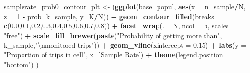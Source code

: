 \documentclass[
]{article}
\newenvironment{Shaded}{\begin{snugshade}}{\end{snugshade}}
\newcommand{\CharTok}[1]{\textcolor[rgb]{0.31,0.60,0.02}{#1}}
\newcommand{\DataTypeTok}[1]{\textcolor[rgb]{0.13,0.29,0.53}{#1}}
\newcommand{\DecValTok}[1]{\textcolor[rgb]{0.00,0.00,0.81}{#1}}
\newcommand{\FloatTok}[1]{\textcolor[rgb]{0.00,0.00,0.81}{#1}}
\newcommand{\KeywordTok}[1]{\textcolor[rgb]{0.13,0.29,0.53}{\textbf{#1}}}
\newcommand{\NormalTok}[1]{#1}
\newcommand{\OperatorTok}[1]{\textcolor[rgb]{0.81,0.36,0.00}{\textbf{#1}}}
\newcommand{\StringTok}[1]{\textcolor[rgb]{0.31,0.60,0.02}{#1}}
\begin{document}
\begin{Shaded}
\begin{Highlighting}[]
{\NormalTok{samplerate_prob0_contour_plt <-}\StringTok{ }\NormalTok{(}\KeywordTok{ggplot}\NormalTok{(base_popul, }
                    \KeywordTok{aes}\NormalTok{(}\DataTypeTok{x =}\NormalTok{ n_sample}\OperatorTok{/}\NormalTok{N, }\DataTypeTok{z =} \DecValTok{1} \OperatorTok{-}\StringTok{ }\NormalTok{prob_k_sample, }\DataTypeTok{y=}\NormalTok{K}\OperatorTok{/}\NormalTok{N)) }
            \OperatorTok{+}\StringTok{ }\KeywordTok{geom_contour_filled}\NormalTok{(}\DataTypeTok{breaks =} \KeywordTok{c}\NormalTok{(}\FloatTok{0.0}\NormalTok{,}\FloatTok{0.1}\NormalTok{,}\FloatTok{0.2}\NormalTok{,}\FloatTok{0.3}\NormalTok{,}\FloatTok{0.4}\NormalTok{,}\FloatTok{0.5}\NormalTok{,}\FloatTok{0.6}\NormalTok{,}\FloatTok{0.7}\NormalTok{,}\FloatTok{0.8}\NormalTok{))}
            \OperatorTok{+}\StringTok{ }\KeywordTok{facet_wrap}\NormalTok{(. }\OperatorTok{~}\StringTok{ }\NormalTok{N, }\DataTypeTok{ncol =} \DecValTok{5}\NormalTok{, }\DataTypeTok{scales =} \StringTok{"free"}\NormalTok{)}
            \OperatorTok{+}\StringTok{ }\KeywordTok{scale_fill_brewer}\NormalTok{(}\KeywordTok{paste}\NormalTok{(}\StringTok{"Probability of getting more than"}\NormalTok{, k_sample,}\StringTok{"}\CharTok{\textbackslash{}n}\StringTok{monitored trips"}\NormalTok{))}
            \OperatorTok{+}\StringTok{ }\KeywordTok{geom_vline}\NormalTok{(}\DataTypeTok{xintercept =} \FloatTok{0.15}\NormalTok{)}
            \OperatorTok{+}\StringTok{ }\KeywordTok{labs}\NormalTok{(}\DataTypeTok{y =} \StringTok{"Proportion of trips in cell"}\NormalTok{, }\DataTypeTok{x=}\StringTok{'Sample Rate'}\NormalTok{)}
                \OperatorTok{+}\StringTok{ }\KeywordTok{theme}\NormalTok{(}\DataTypeTok{legend.position =} \StringTok{"bottom"}\NormalTok{)}
\NormalTok{            )}


}
\end{Highlighting}
\end{Shaded}
\end{document}
